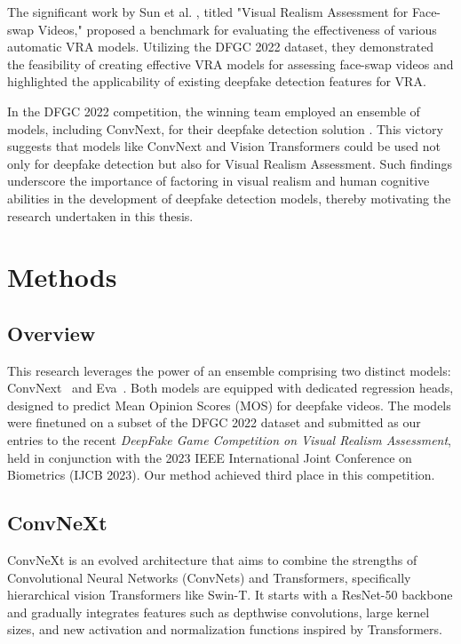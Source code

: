 \documentclass[a4paper,12pt,openright]{book}
\begin{document}
The significant work by Sun et al. \cite{sun2023visual}, titled "Visual Realism Assessment for Face-swap Videos," proposed a benchmark for evaluating the effectiveness of various automatic VRA models. Utilizing the DFGC 2022 dataset, they demonstrated the feasibility of creating effective VRA models for assessing face-swap videos and highlighted the applicability of existing deepfake detection features for VRA.

In the DFGC 2022 competition, the winning team employed an ensemble of models, including ConvNext, for their deepfake detection solution \cite{peng2022dfgc}. This victory suggests that models like ConvNext and Vision Transformers could be used not only for deepfake detection but also for Visual Realism Assessment. Such findings underscore the importance of factoring in visual realism and human cognitive abilities in the development of deepfake detection models, thereby motivating the research undertaken in this thesis.

\chapter{Methods}
\label{chap:methods}

\section{Overview}

This research leverages the power of an ensemble comprising two distinct models:
ConvNext~\cite{DBLP:journals/corr/abs-2201-03545} and Eva~\cite{fang2022eva}. Both models are equipped with dedicated regression heads, designed to predict Mean Opinion Scores (MOS) for deepfake videos. The models were finetuned on a subset of the DFGC 2022 dataset and submitted as our entries to the recent \textit{DeepFake Game Competition on Visual Realism Assessment}, held in conjunction with the 2023 IEEE International Joint Conference on Biometrics (IJCB 2023). Our method achieved third place in this competition.

\section{ConvNeXt}
\label{sec:convnext}

ConvNeXt is an evolved architecture that aims to combine the strengths of Convolutional Neural Networks (ConvNets) and Transformers, specifically hierarchical vision Transformers like Swin-T\cite{DBLP:journals/corr/abs-2103-14030}. It starts with a ResNet-50\cite{DBLP:journals/corr/HeZRS15} backbone and gradually integrates features such as depthwise convolutions, large kernel sizes, and new activation and normalization functions inspired by Transformers.
\end{document}
